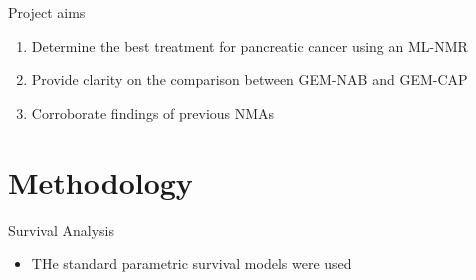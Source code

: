 \documentclass{beamer}
\begin{document}
\begin{frame}{Project aims}
    \begin{enumerate}
        \item Determine the best treatment for pancreatic cancer using an ML-NMR
        \item Provide clarity on the comparison between GEM-NAB and GEM-CAP
        \item Corroborate findings of previous NMAs
    \end{enumerate} 
\end{frame} 

\section{Methodology}

\begin{frame}{Survival Analysis}
    \begin{itemize}
        \item THe standard parametric survival models were used
    \end{itemize}   
\end{frame} 
\end{document}
